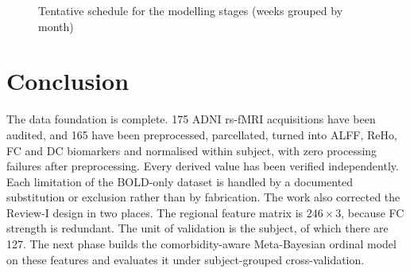 \documentclass{ssnreview}
\begin{document}
\begin{figure}[H]
\centering
{}
\caption{Tentative schedule for the modelling stages (weeks grouped by month)}
\label{fig:gantt}
\end{figure}

\section{Conclusion}
The data foundation is complete. 175 ADNI rs-fMRI acquisitions have been
audited, and 165 have been preprocessed, parcellated, turned into ALFF, ReHo,
FC and DC biomarkers and normalised within subject, with zero processing
failures after preprocessing. Every derived value has been verified
independently. Each limitation of the BOLD-only dataset is handled by a
documented substitution or exclusion rather than by fabrication. The
work also corrected the Review-I design in two places. The regional feature
matrix is $246\times3$, because FC strength is redundant. The unit of
validation is the subject, of which there are 127. The next phase builds the
comorbidity-aware Meta-Bayesian ordinal model on these features and evaluates
it under subject-grouped cross-validation.
\end{document}
